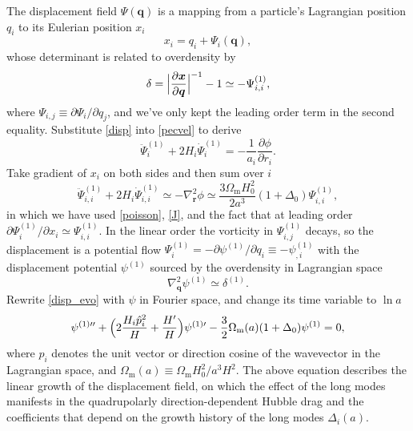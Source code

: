 \documentclass[a4paper,11pt]{article}
\newcommand{\vr}{{\bm r}}
\newcommand{\vx}{{\bm x}}
\newcommand{\vq}{{\bm q}}
\begin{document}
The displacement field $\Psi(\vq)$ is a mapping from a particle's Lagrangian
position $q_i$ to its Eulerian position $x_i$
\begin{equation}
    x_i = q_i + \Psi_i(\vq),
    \label{disp}
\end{equation}
whose determinant is related to overdensity by
\begin{equation}
    \delta = \Bigl| \frac{\partial\vx}{\partial\vq} \Bigr|^{-1} - 1
    \simeq - \Psi_{i,i}^{(1)},
    \label{J}
\end{equation}
where $\Psi_{i,j} \equiv \partial\Psi_i / \partial q_j$, and we've only kept
the leading order term in the second equality.
Substitute \eqref{disp} into \eqref{pecvel} to derive
\begin{equation}
    \ddot \Psi_i^{(1)} + 2 H_i \dot \Psi_i^{(1)} = - \frac1{a_i}
    \frac{\partial\phi}{\partial r_i}.
\end{equation}
Take gradient of $x_i$ on both sides and then sum over $i$
\begin{equation}
    \ddot \Psi_{i,i}^{(1)} + 2 H_i \dot \Psi_{i,i}^{(1)} \simeq - \nabla_\vr^2 \phi
    \simeq \frac{3\Omega_\mathrm{m} H_0^2}{2 a^3} (1 + \Delta_0) \Psi_{i,i}^{(1)},
    \label{disp_evo}
\end{equation}
in which we have used \eqref{poisson}, \eqref{J}, and the fact that at leading
order $\partial\Psi_i^{(1)} / \partial x_i \simeq \Psi_{i,i}^{(1)}$.
In the linear order the vorticity in $\Psi_{i,j}^{(1)}$ decays, so the displacement
is a potential flow $\Psi_i^{(1)} = - \partial\psi^{(1)}/ \partial q_i \equiv -\psi_{,i}^{(1)}$
with the displacement potential $\psi^{(1)}$ sourced by the overdensity in Lagrangian
space
\begin{equation}
    \nabla_\vq^2 \psi^{(1)} \simeq \delta^{(1)}.
\end{equation}
Rewrite \eqref{disp_evo} with $\psi$ in Fourier space, and change its time
variable to $\ln a$
\begin{equation}
    \psi^{(1)\prime\prime} + \Bigl( 2 \frac{H_i \hat p_i^2} H + \frac{H'} H \Bigr) \psi^{(1)\prime}
    - \frac32 \Omega_\mathrm{m}(a) (1 + \Delta_0) \psi^{(1)} = 0,
    \label{pot_evo}
\end{equation}
where $\hat p_i$ denotes the unit vector or direction cosine of the wavevector
in the Lagrangian space, and $\Omega_\mathrm{m}(a) \equiv \Omega_\mathrm{m}
H_0^2 / a^3 H^2$.
The above equation describes the linear growth of the displacement field, on
which the effect of the long modes manifests in the quadrupolarly
direction-dependent Hubble drag and the coefficients that depend on the growth
history of the long modes $\Delta_i(a)$.
\end{document}
